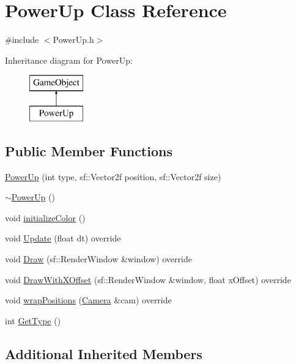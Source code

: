 \hypertarget{class_power_up}{}\section{Power\+Up Class Reference}
\label{class_power_up}


{\ttfamily \#include $<$Power\+Up.\+h$>$}

Inheritance diagram for Power\+Up\+:\begin{figure}[H]
\begin{center}
\leavevmode
\includegraphics[height=2.000000cm]{class_power_up}
\end{center}
\end{figure}
\subsection*{Public Member Functions}
\begin{DoxyCompactItemize}
\item 
\hyperlink{class_power_up_a46d048ad5911ef25dcf55de24e8dde73}{Power\+Up} (int type, sf\+::\+Vector2f position, sf\+::\+Vector2f size)
\item 
\hyperlink{class_power_up_a353053fe27c5a148a2fcd4f5f45e19af}{$\sim$\+Power\+Up} ()
\item 
void \hyperlink{class_power_up_a3319d56353d0845a1fba25340537d1b9}{initialize\+Color} ()
\item 
void \hyperlink{class_power_up_ab5d07a771930ebeadb6b8b0567436560}{Update} (float dt) override
\item 
void \hyperlink{class_power_up_a0f52fe4ae4e6e47fa3fd4fb2bcc2dcb7}{Draw} (sf\+::\+Render\+Window \&window) override
\item 
void \hyperlink{class_power_up_a4ddb447c9a6bdf1475bc2334590ba55e}{Draw\+With\+X\+Offset} (sf\+::\+Render\+Window \&window, float x\+Offset) override
\item 
void \hyperlink{class_power_up_ad9ec62c1a3832e17949044c8349d0afb}{wrap\+Positions} (\hyperlink{class_camera}{Camera} \&cam) override
\item 
int \hyperlink{class_power_up_aa4c470221625cfabf02a60e2e386f06f}{Get\+Type} ()
\end{DoxyCompactItemize}
\subsection*{Additional Inherited Members}


